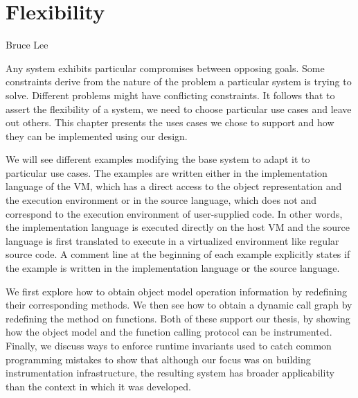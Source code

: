 \chapter{Flexibility}
\label{chap:Flexibility}

{Bruce Lee}

Any system exhibits particular compromises between opposing goals. Some
constraints derive from the nature of the problem a particular system is trying
to solve. Different problems might have conflicting constraints. It follows
that to assert the flexibility of a system, we need to choose particular use
cases and leave out others. This chapter presents the uses cases we chose to
support and how they can be implemented using our design.


We will see different examples modifying the base system to adapt it to
particular use cases. The examples are written either in the implementation
language of the VM, which has a direct access to the object representation and
the execution environment or in the source language, which does not and
correspond to the execution environment of user-supplied code. In other words,
the implementation language is executed directly on the host VM and the source
language is first translated to execute in a virtualized environment like
regular source code. A comment line at the beginning of each example explicitly
states if the example is written in the implementation language or the source
language.

We first explore how to obtain object model operation information by redefining
their corresponding methods.  We then see how to obtain a dynamic call graph by
redefining the  method on functions. Both of these support our thesis,
by showing how the object model and the function calling protocol can be
instrumented. Finally, we discuss ways to enforce runtime invariants used to
catch common programming mistakes to show that although our focus was on
building instrumentation infrastructure, the resulting system has broader
applicability than the context in which it was developed.

